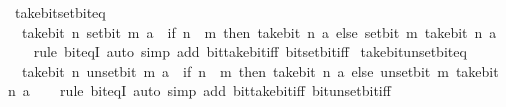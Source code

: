\begin{isabellebody}
\endisatagproof
{\isafoldproof}%
%
\isadelimproof
\isanewline
%
\endisadelimproof
\isanewline
{}\isamarkupfalse%
\ take{\isacharunderscore}{\kern0pt}bit{\isacharunderscore}{\kern0pt}set{\isacharunderscore}{\kern0pt}bit{\isacharunderscore}{\kern0pt}eq{\isacharcolon}{\kern0pt}\isanewline
\ \ {\isacartoucheopen}take{\isacharunderscore}{\kern0pt}bit\ n\ {\isacharparenleft}{\kern0pt}set{\isacharunderscore}{\kern0pt}bit\ m\ a{\isacharparenright}{\kern0pt}\ {\isacharequal}{\kern0pt}\ {\isacharparenleft}{\kern0pt}if\ n\ {\isasymle}\ m\ then\ take{\isacharunderscore}{\kern0pt}bit\ n\ a\ else\ set{\isacharunderscore}{\kern0pt}bit\ m\ {\isacharparenleft}{\kern0pt}take{\isacharunderscore}{\kern0pt}bit\ n\ a{\isacharparenright}{\kern0pt}{\isacharparenright}{\kern0pt}{\isacartoucheclose}\isanewline
%
\isadelimproof
\ \ %
\endisadelimproof
%
\isatagproof
{}\isamarkupfalse%
\ {\isacharparenleft}{\kern0pt}rule\ bit{\isacharunderscore}{\kern0pt}eqI{\isacharparenright}{\kern0pt}\ {\isacharparenleft}{\kern0pt}auto\ simp\ add{\isacharcolon}{\kern0pt}\ bit{\isacharunderscore}{\kern0pt}take{\isacharunderscore}{\kern0pt}bit{\isacharunderscore}{\kern0pt}iff\ bit{\isacharunderscore}{\kern0pt}set{\isacharunderscore}{\kern0pt}bit{\isacharunderscore}{\kern0pt}iff{\isacharparenright}{\kern0pt}%
\endisatagproof
{\isafoldproof}%
%
\isadelimproof
\isanewline
%
\endisadelimproof
\isanewline
{}\isamarkupfalse%
\ take{\isacharunderscore}{\kern0pt}bit{\isacharunderscore}{\kern0pt}unset{\isacharunderscore}{\kern0pt}bit{\isacharunderscore}{\kern0pt}eq{\isacharcolon}{\kern0pt}\isanewline
\ \ {\isacartoucheopen}take{\isacharunderscore}{\kern0pt}bit\ n\ {\isacharparenleft}{\kern0pt}unset{\isacharunderscore}{\kern0pt}bit\ m\ a{\isacharparenright}{\kern0pt}\ {\isacharequal}{\kern0pt}\ {\isacharparenleft}{\kern0pt}if\ n\ {\isasymle}\ m\ then\ take{\isacharunderscore}{\kern0pt}bit\ n\ a\ else\ unset{\isacharunderscore}{\kern0pt}bit\ m\ {\isacharparenleft}{\kern0pt}take{\isacharunderscore}{\kern0pt}bit\ n\ a{\isacharparenright}{\kern0pt}{\isacharparenright}{\kern0pt}{\isacartoucheclose}\isanewline
%
\isadelimproof
\ \ %
\endisadelimproof
%
\isatagproof
{}\isamarkupfalse%
\ {\isacharparenleft}{\kern0pt}rule\ bit{\isacharunderscore}{\kern0pt}eqI{\isacharparenright}{\kern0pt}\ {\isacharparenleft}{\kern0pt}auto\ simp\ add{\isacharcolon}{\kern0pt}\ bit{\isacharunderscore}{\kern0pt}take{\isacharunderscore}{\kern0pt}bit{\isacharunderscore}{\kern0pt}iff\ bit{\isacharunderscore}{\kern0pt}unset{\isacharunderscore}{\kern0pt}bit{\isacharunderscore}{\kern0pt}iff{\isacharparenright}{\kern0pt}%

\end{isabellebody}
